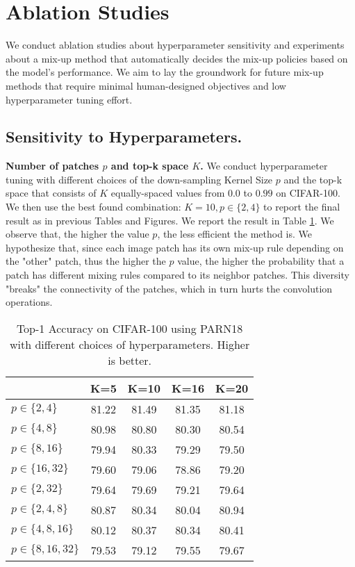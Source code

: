 \documentclass[letterpaper]{article} \usepackage[submission]{aaai23}  \usepackage{times}  \usepackage{helvet}  \usepackage{courier}  \usepackage[hyphens]{url}  \usepackage{graphicx} \urlstyle{rm} \def\UrlFont{\rm}  \usepackage{natbib}  \usepackage{caption} \frenchspacing  \setlength{\pdfpagewidth}{8.5in} \setlength{\pdfpageheight}{11in}
\newcommand{\cifar}{CIFAR-100}
\begin{document}
\section{Ablation Studies}
\label{sec:abl-study}
We conduct ablation studies about hyperparameter sensitivity and experiments about a mix-up method that automatically decides the mix-up policies based on the model's performance. We aim to lay the groundwork for future mix-up methods that require minimal human-designed objectives and low hyperparameter tuning effort.


\subsection{Sensitivity to Hyperparameters.}
\textbf{Number of patches $p$ and top-k space $K$.} We conduct hyperparameter tuning with different choices of the down-sampling Kernel Size $p$ and the top-k space that consists of $K$ equally-spaced values from $0.0$ to $0.99$ on \cifar{}. We then use the best found combination: $K=10, p \in \{2, 4\}$ to report the final result as in previous Tables and Figures. We report the result in Table \ref{tab:hyperparam}. We observe that, the higher the value $p$, the less efficient the method is. We hypothesize that, since each image patch has its own mix-up rule depending on the "other" patch, thus the higher the $p$ value, the higher the probability that a patch has different mixing rules compared to its neighbor patches. This diversity "breaks" the connectivity of the patches, which in turn hurts the convolution operations.


\begin{table}[h!]
\centering
\begin{tabular}{l|cccc}
 & K=5 & K=10 & K=16 & K=20 \\ \hline
$p \in \{2, 4\}$ & 81.22 & 81.49 & 81.35 & 81.18 \\
$p \in \{4, 8\}$ & 80.98 & 80.80 & 80.30 & 80.54 \\
$p \in \{8, 16\}$ & 79.94 & 80.33 & 79.29 & 79.50 \\
$p \in \{16, 32\}$ & 79.60 & 79.06 & 78.86 & 79.20 \\
$p \in \{2, 32\}$ & 79.64 & 79.69 & 79.21 & 79.64 \\
$p \in \{2, 4, 8\}$ & 80.87 & 80.34 & 80.04 & 80.94 \\
$p \in \{4, 8, 16\}$ & 80.12 & 80.37 & 80.34 & 80.41 \\
$p \in \{8, 16, 32\}$ & 79.53 & 79.12 & 79.55 & 79.67
\end{tabular}
\caption{Top-1 Accuracy on \cifar{} using PARN18 with different choices of hyperparameters. Higher is better.}
\label{tab:hyperparam}
\end{table}
\end{document}
